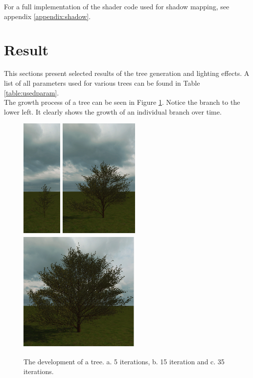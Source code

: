 \documentclass{article}
\begin{document}
  				For a full implementation of the shader code used for shadow mapping, see appendix \ref{appendix:shadow}.
  				
  	\section{Result}
  		
  		This sections present selected results of the tree generation and lighting effects. A list of all parameters used for various trees can be found in Table \ref{table:usedparam}. \\
  		
  		The growth process of a tree can be seen in Figure \ref{fig:treegrowth}. Notice the branch to the lower left. It clearly shows the growth of an individual branch over time. \\
  		
  		\begin{figure}[t]
  			\centering
  			\includegraphics[height=6cm]{treegrowth1}
  			\includegraphics[height=6cm]{treegrowth2}
  			\includegraphics[height=6cm]{treegrowth3}

  			\caption{The development of a tree. a. 5 iterations, b. 15 iteration and c. 35 iterations. }
  			\label{fig:treegrowth}
  		\end{figure}
  	
\end{document}
